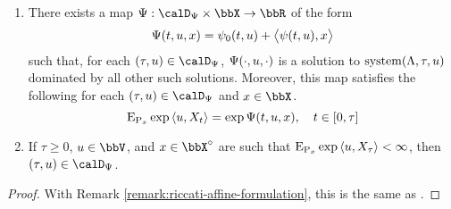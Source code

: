 \begin{theorem}
  \label{theorem:KM}
  \begin{enumerate}[label=(\alph*)]
    \item
      \label{theorem:KM:1}
      There exists a map $\aff: \momentSpace \times \stateSpace \rightarrow \bbR$ of the form
      \begin{equation*}
        \Psi(t,u,x) = \psi_0(t,u) + {\big\langle \psi(t,u) , x \big\rangle}
      \end{equation*}
      such that, for each $(\tau,\momentVar) \in \momentSpace$, $\Psi(\cdot,u,\cdot)$ is a solution to $\operatorname{system}(\Lambda,\tau,u)$ dominated by all other such solutions.
      Moreover, this map satisfies the following for each $(\tau, \momentVar) \in \momentSpace$ and $\stateVar \in \stateSpace$.
      \begin{equation}
        \label{theorem:KM-moments}
        {\operatorname{E}}_{{\operatorname{P}}_x}\exp{\langle u, X_t \rangle} = \exp\Psi(t, u, x), \quad t \in [0,\tau]
      \end{equation}
    \item
      \label{theorem:KM:2}
      If $\tau \geq 0$, $\momentVar \in \vecSpace$, and $\stateVar \in \stateSpace^\circ$ are such that  ${\operatorname{E}}_{{\operatorname{P}}_x}\exp{\langle u, X_\tau \rangle} < \infty$, then $(\tau, \momentVar) \in \momentSpace$.
  \end{enumerate}
\end{theorem}
\begin{proof}
  \label{proof:theorem:KM}
  With Remark \ref{remark:riccati-affine-formulation}, this is the same as \cite[Theorem 2.14]{keller2015}.
\end{proof}
